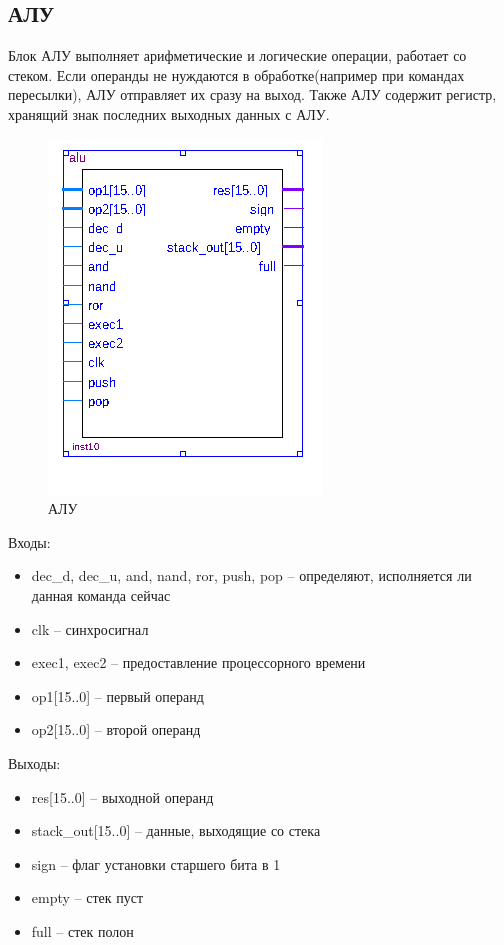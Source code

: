 \subsection{АЛУ}
Блок АЛУ выполняет арифметические и логические операции, работает со стеком. Если операнды не нуждаются в обработке(например при командах пересылки), АЛУ отправляет их сразу на выход. Также АЛУ содержит регистр, хранящий знак последних выходных данных с АЛУ.

\begin{figure}[ht]
\centering
    \includegraphics[scale=0.8]{alub}
    \caption{АЛУ}
\end{figure}

Входы:
\begin{itemize}
    \item dec\_d, dec\_u, and, nand, ror, push, pop -- определяют, исполняется ли данная команда сейчас
    \item clk -- синхросигнал
    \item exec1, exec2 -- предоставление процессорного времени
    \item op1[15..0] -- первый операнд
    \item op2[15..0] -- второй операнд
\end{itemize}
Выходы:
\begin{itemize}
    \item res[15..0] -- выходной операнд
    \item stack\_out[15..0] -- данные, выходящие со стека
    \item sign -- флаг установки старшего бита в 1
    \item empty -- стек пуст
    \item full -- стек полон
\end{itemize}

